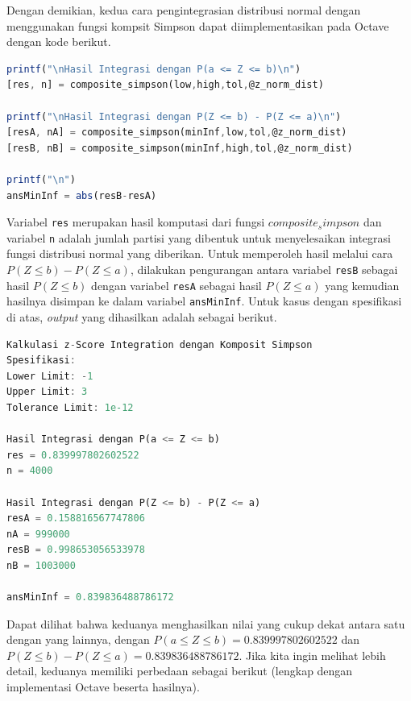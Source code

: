 \documentclass[journal,12pt,onecolumn,a4paper]{IEEEtran}
\begin{document}
Dengan demikian, kedua cara pengintegrasian distribusi normal dengan menggunakan fungsi kompsit Simpson dapat diimplementasikan pada Octave dengan kode berikut.

\begin{center}
	\begin{lstlisting}[language=Octave]
printf("\nHasil Integrasi dengan P(a <= Z <= b)\n")
[res, n] = composite_simpson(low,high,tol,@z_norm_dist)
		
printf("\nHasil Integrasi dengan P(Z <= b) - P(Z <= a)\n")
[resA, nA] = composite_simpson(minInf,low,tol,@z_norm_dist)
[resB, nB] = composite_simpson(minInf,high,tol,@z_norm_dist)
		
printf("\n")
ansMinInf = abs(resB-resA)
	\end{lstlisting}
\end{center}

Variabel \lstinline{res} merupakan hasil komputasi dari fungsi \(composite_simpson\) dan variabel \lstinline{n} adalah jumlah partisi yang dibentuk untuk menyelesaikan integrasi fungsi distribusi normal yang diberikan. Untuk memperoleh hasil melalui cara \(P(Z \le b ) - P(Z \le a )\), dilakukan pengurangan antara variabel \lstinline{resB} sebagai hasil \(P(Z \le b )\) dengan variabel \lstinline{resA} sebagai hasil \(P(Z \le a )\) yang kemudian hasilnya disimpan ke dalam variabel \lstinline{ansMinInf}. Untuk kasus dengan spesifikasi di atas, \emph{output} yang dihasilkan adalah sebagai berikut.

\begin{center}
	\begin{lstlisting}[language=Octave]
Kalkulasi z-Score Integration dengan Komposit Simpson
Spesifikasi:
Lower Limit: -1
Upper Limit: 3
Tolerance Limit: 1e-12
		
Hasil Integrasi dengan P(a <= Z <= b)
res = 0.839997802602522
n = 4000
	
Hasil Integrasi dengan P(Z <= b) - P(Z <= a)
resA = 0.158816567747806
nA = 999000
resB = 0.998653056533978
nB = 1003000
		
ansMinInf = 0.839836488786172
	\end{lstlisting}
\end{center}

Dapat dilihat bahwa keduanya menghasilkan nilai yang cukup dekat antara satu dengan yang lainnya, dengan \(P(a \le Z \le b)= 0.839997802602522\)  dan \(P(Z \le b ) - P(Z \le a ) = 0.839836488786172\). Jika kita ingin melihat lebih detail, keduanya memiliki perbedaan sebagai berikut (lengkap dengan implementasi Octave beserta hasilnya).
\end{document}
